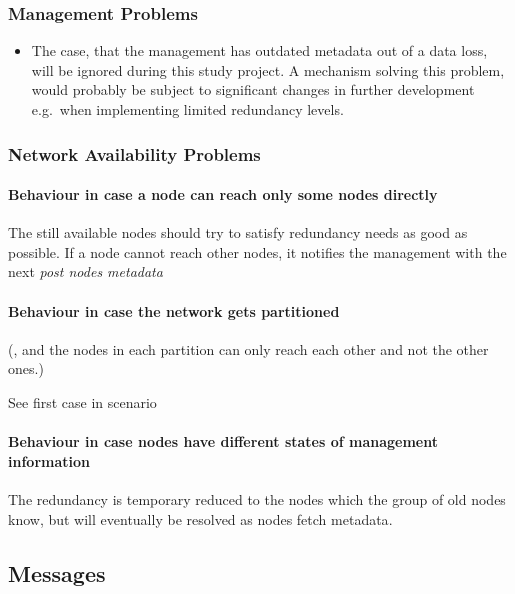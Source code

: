 \subsubsection{Management Problems}\label{sec:scenario-management-problems}
\begin{itemize}
    \item The case, that the \gls{management} has outdated \gls{metadata} out of a data loss, will be ignored during this study project. A mechanism solving this problem, would probably be subject to significant changes in further development e.g.\ when implementing limited redundancy levels. %
\end{itemize}

\subsubsection{Network Availability Problems}\label{sec:scenario-network-errors}
\paragraph{Behaviour in case a node can reach only some nodes directly}
The still available \glspl{node} should try to satisfy redundancy needs as good as possible.
If a \gls{node} cannot reach other \glspl{node}, it notifies the \gls{management} with the next \emph{post nodes metadata}

\paragraph{Behaviour in case the network gets partitioned}
(, and the \glspl{node} in each partition can only reach each other and not the other ones.)

See first case in scenario~

\paragraph{Behaviour in case nodes have different states of management information}
The redundancy is temporary reduced to the \glspl{node} which the group of old \glspl{node} know, but will eventually be resolved as \glspl{node} fetch \gls{metadata}.


\subsection{Messages}\label{sec:messages}

